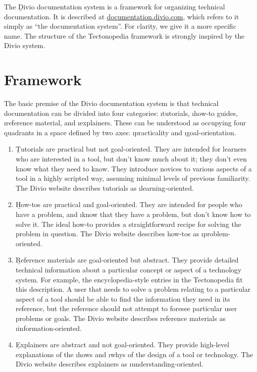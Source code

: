 
The \b{Divio documentation system} is a framework for organizing technical
documentation. It is described at
\href{https://documentation.divio.com/}{documentation.divio.com}, which refers
to it simply as “the documentation system”. For clarity, we give it a more
specific name. The structure of the Tectonopedia framework is strongly inspired
by the Divio system.


\section*{Framework}

The basic premise of the Divio documentation system is that technical
documentation can be divided into four categories: \i{tutorials}, \i{how-to
guides}, \i{reference material}, and \i{explainers}. These can be understood as
occupying four quadrants in a space defined by two axes: \i{practicality} and
\i{goal-orientation}.

\begin{enumerate}
  \item \b{Tutorials} are practical but not goal-oriented. They are intended for
  learners who are interested in a tool, but don't know much about it; they
  don't even know what they need to know. They introduce novices to various
  aspects of a tool in a highly scripted way, assuming minimal levels of
  previous familiarity. The Divio website describes tutorials as
  \i{learning-oriented}.

  \item \b{How-tos} are practical and goal-oriented. They are intended for
  people who have a problem, and \i{know} that they have a problem, but don't
  know how to solve it. The ideal how-to provides a straightforward recipe for
  solving the problem in question. The Divio website describes how-tos as
  \i{problem-oriented}.

  \item \b{Reference materials} are goal-oriented but abstract. They provide
  detailed technical information about a particular concept or aspect of a
  technology system. For example, the encyclopedia-style entries in the
  Tectonopedia fit this description.  A user that needs to solve a problem
  relating to a particular aspect of a tool should be able to find the
  information they need in its reference, but the reference should not attempt
  to foresee particular user problems or goals. The Divio website describes
  reference materials as \i{information-oriented}.

  \item \b{Explainers} are abstract and not goal-oriented. They provide
  high-level explanations of the \i{hows} and \i{whys} of the design of a tool
  or technology. The Divio website describes explainers as
  \i{understanding-oriented}.
\end{enumerate}
